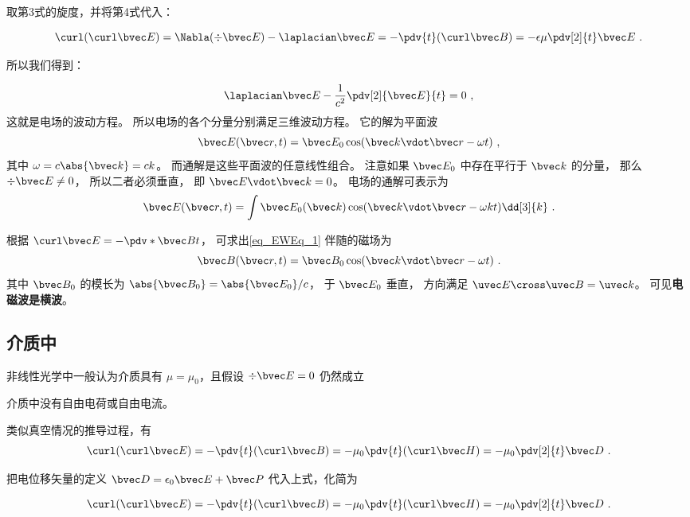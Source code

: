 取第3式的旋度，并将第4式代入：

\begin{equation}
\curl(\curl\bvec E) = \Nabla (\div \bvec E) - \laplacian \bvec E = -\pdv{t} (\curl\bvec B) = -\epsilon \mu \pdv[2]{t} \bvec E~.
\end{equation}

所以我们得到：

\begin{equation}
\laplacian \bvec E - \frac{1}{c^2} \pdv[2]{\bvec E}{t} = 0~,
\end{equation}
这就是电场的波动方程。 所以电场的各个分量分别满足三维波动方程。%
它的解为平面波
\begin{equation}\label{eq_EWEq_1}
\bvec E(\bvec r, t) = \bvec E_0 \cos(\bvec k\vdot \bvec r - \omega t)~,
\end{equation}
其中 $\omega = c\abs{\bvec k} = ck$。 而通解是这些平面波的任意线性组合。 注意如果 $\bvec E_0$ 中存在平行于 $\bvec k$ 的分量， 那么 $\div \bvec E \ne 0$， 所以二者必须垂直， 即 $\bvec E \vdot \bvec k = 0$。 电场的通解可表示为
\begin{equation}
\bvec E(\bvec r, t) = \int \bvec E_0(\bvec k) \cos(\bvec k\vdot \bvec r - \omega k t) \dd[3]{k}~.
\end{equation}

根据 $\curl \bvec E = -\pdv*{\bvec B}{t}$， 可求出\autoref{eq_EWEq_1} 伴随的磁场为
\begin{equation}
\bvec B(\bvec r, t) = \bvec B_0 \cos(\bvec k \vdot \bvec r - \omega t)~.
\end{equation}
其中 $\bvec B_0$ 的模长为 $\abs{\bvec B_0} = \abs{\bvec E_0}/c$， 于 $\bvec E_0$ 垂直， 方向满足 $\uvec E \cross \uvec B = \uvec k$。 可见\textbf{电磁波是横波}。

\subsection{介质中}

非线性光学中一般认为介质具有 $\mu = \mu_0$，且假设 $\div\bvec E = 0$ 仍然成立

介质中没有自由电荷或自由电流。

类似真空情况的推导过程，有
\begin{equation}
\curl(\curl\bvec E) = -\pdv{t} (\curl\bvec B) = -\mu_0 \pdv{t} (\curl\bvec H)
= -\mu_0 \pdv[2]{t} \bvec D~.
\end{equation}

把电位移矢量的定义 $\bvec D = \epsilon_0\bvec E + \bvec P$ 代入上式，化简为

\begin{equation}
\curl(\curl\bvec E) = -\pdv{t} (\curl\bvec B) = -\mu_0 \pdv{t} (\curl\bvec H)
= -\mu_0 \pdv[2]{t} \bvec D~.
\end{equation}
